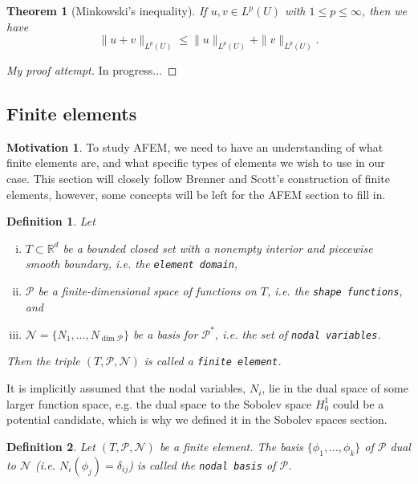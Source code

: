 \documentclass[11pt]{article}
\newtheorem{theorem}{Theorem}
\newtheorem{definition}{Definition}
\theoremstyle{definition}
\newtheorem*{motivation}{Motivation}
\begin{document}
\begin{theorem}[Minkowski's inequality]
	If $u,v \in L^p(U)$ with $1 \leq p \leq \infty$, then we have
	\begin{equation*}
		\|u+v\|_{L^p(U)} \leq \|u\|_{L^p(U)} + \|v\|_{L^p(U)}.
	\end{equation*}
\end{theorem}
\begin{proof}[My proof attempt]
	In progress...
\end{proof}

\newpage
\subsection{Finite elements}
\begin{motivation}
	To study AFEM, we need to have an understanding of what finite elements are, and what specific types of elements
	we wish to use in our case. This section will closely follow Brenner and Scott's \cite{brenner2007mathematical} 
	construction of finite elements, however, some concepts will be left for the AFEM section to fill in.
\end{motivation}
\begin{definition} Let
	\begin{enumerate}[(i)]
		\item $T \subset \mathbb{R}^d$ be a bounded closed set with a nonempty interior and piecewise smooth boundary,
			i.e. the \texttt{element domain},
		\item $\mathcal{P}$ be a finite-dimensional space of functions on $T$,
			i.e. the \texttt{shape functions}, and
		\item $\mathcal{N} = \{N_1, \dots, N_{\dim{\mathcal{P}}}\}$ be a basis for $\mathcal{P}^*$,
			i.e. the set of \texttt{nodal variables}.
	\end{enumerate}
	Then the triple $(T, \mathcal{P}, \mathcal{N})$ is called a \texttt{finite element}.
\end{definition}
It is implicitly assumed that the nodal variables, $N_i$, lie in the dual space of some larger function space,
e.g. the dual space to the Sobolev space $H_0^{1}$ could be a potential candidate, which is why we defined it in the Sobolev spaces section.

\begin{definition}
	Let $(T, \mathcal{P}, \mathcal{N})$ be a finite element. The basis $\{\phi_1, \dots, \phi_k\}$ of $\mathcal{P}$
	dual to $\mathcal{N}$ (i.e. $N_i(\phi_j) = \delta_{ij}$) is called the \texttt{nodal basis} of $\mathcal{P}$.
\end{definition}
\end{document}
